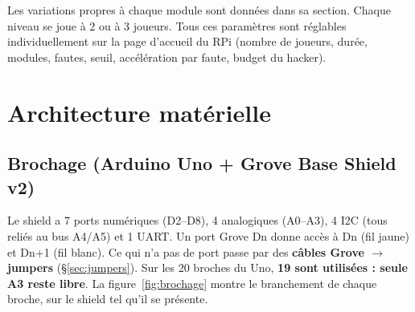 \documentclass[11pt,a4paper]{article}
\begin{document}
Les variations propres à chaque module sont données dans sa section. Chaque niveau se joue à 2 ou à 3 joueurs. Tous ces paramètres sont réglables individuellement sur la page d'accueil du RPi (nombre de joueurs, durée, modules, fautes, seuil, accélération par faute, budget du hacker).

\section{Architecture matérielle}
\label{sec:materiel}

\subsection{Brochage (Arduino Uno + Grove Base Shield v2)}
\label{sec:brochage}

Le shield a 7 ports numériques (D2--D8), 4 analogiques (A0--A3), 4 I2C (tous reliés au bus A4/A5) et 1 UART. Un port Grove Dn donne accès à Dn (fil jaune) et Dn+1 (fil blanc). Ce qui n'a pas de port passe par des \textbf{câbles Grove $\to$ jumpers} (\S\ref{sec:jumpers}). Sur les 20 broches du Uno, \textbf{19 sont utilisées : seule A3 reste libre}. La figure~\ref{fig:brochage} montre le branchement de chaque broche, sur le shield tel qu'il se présente.
\end{document}
